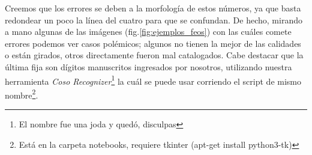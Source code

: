 Creemos que los errores se deben a la morfología de estos números, ya que basta redondear un poco la línea del cuatro para que se confundan. De hecho, mirando a mano algunas de las imágenes (fig.\ref{fig:ejemplos_feos}) con las cuáles comete errores podemos ver casos polémicos; algunos no tienen la mejor de las calidades o están girados, otros directamente fueron mal catalogados. Cabe destacar que la última fija son dígitos manuscritos ingresados por nosotros, utilizando nuestra herramienta \textit{Coso Recognizer}\footnote{El nombre fue una joda y quedó, disculpas} la cuál se puede usar corriendo el script de mismo nombre\footnote{Está en la carpeta notebooks, requiere tkinter (apt-get install python3-tk)}.
\begin{figure}[h]
    \centering
    

\end{figure}
